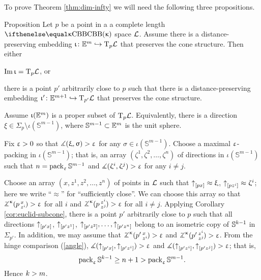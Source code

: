 To prove Theorem \ref{thm:dim-infty} we will need the following three propositions.

\begin{thm}{Proposition}\label{E=T}
Let $p$ be a point in a a complete length $\Alex{\kappa}$ space
$\mathcal{L}$.
Assume there is a distance-preserving embedding $\iota\:\EE^{m}\hookrightarrow \T_p\spc{L}$ 
that preserves the cone structure.
Then either
\begin{subthm}{}
 $\mathop{\rm Im}\nolimits\upiota=\text{\rm T}_p\mathcal{L}$, or
\end{subthm}

\begin{subthm}{} there is a point $p'$ arbitrarily close to $p$ such that there is a distance-preserving embedding $\iota'\:\EE^{m+1}\hookrightarrow \T_{p'}\spc{L}$ 
that preserves the cone structure.
\end{subthm}
\end{thm}

Assume $\upiota(\mathbb{E}^{m})$ is a proper subset of $\text{\rm T}_p\mathcal{L}$.
Equivalently, there is a direction $\xi \in \Sigma_p\setminus\iota(\mathbb{S}^{m-1})$,
where $\mathbb{S}^{m-1}\subset \EE^m$ is the unit sphere. 

Fix $\upvarepsilon>0$ so that $\measuredangle(\upxi,\upsigma)>\upvarepsilon$ for any $\sigma\in \iota(\mathbb{S}^{m-1})$. 
Choose a maximal $\upvarepsilon$-packing in $\iota(\mathbb{S}^{m-1})$;
that is, an array $(\zeta^1,\zeta^2,\dots,\zeta^n)$ of directions in $\iota(\mathbb{S}^{m-1})$ such that $n=\mathop{\rm pack}\nolimits_\upvarepsilon \mathbb{S}^{m-1}$ and $\measuredangle(\upzeta^i,\upzeta^j)>\upvarepsilon$ for any $i\ne j$.

Choose an array $(x,z^1,z^2,\dots,z^n)$ of points in $\mathcal{L}$ such that
$\dir p x\approx\xi$, $\dir p{z^i}\approx\zeta^i$; 
here we write ``$\approx$'' for ``sufficiently close''.
We can choose this array so that
$\angk{\kappa}p x{z^i}>\eps$ for all $i$ 
and $\angk{\kappa}p{z^i}{z^j}>\eps$ for all $i\ne j$.
Applying Corollary \ref{cor:euclid-subcone}, there is a point $p'$ arbitrarily close to $p$ 
such that all directions ${\uparrow}_{[{p'}{x}]}$, ${\uparrow}_{[{p'}{z^1}]}$, $\dir{p'}{z^2},\dots,\dir{p'}{z^n}$
belong to an isometric copy of $\mathbb{S}^{k-1}$ in $\Sigma_{p'}$.
In addition, we may assume that $\angk{\kappa}{p'}x{z^i}>\eps$ and $\angk{\kappa}{p'}{z^i}{z^j}>\eps$.
From the hinge comparison (\ref{angle}),
$\measuredangle({\uparrow}_{[{p'}{x}]},{\uparrow}_{[{p'}{z^i}]})>\upvarepsilon$ 
and $\measuredangle({\uparrow}_{[{p'}{z^i}]},{\uparrow}_{[{p'}{z^j}]})>\upvarepsilon$;
that is, 
\[\pack_\eps \mathbb{S}^{\kay-1}\ge n+1>\pack_\eps \mathbb{S}^{m-1}.\] 
Hence $k>m$.
\qeds

